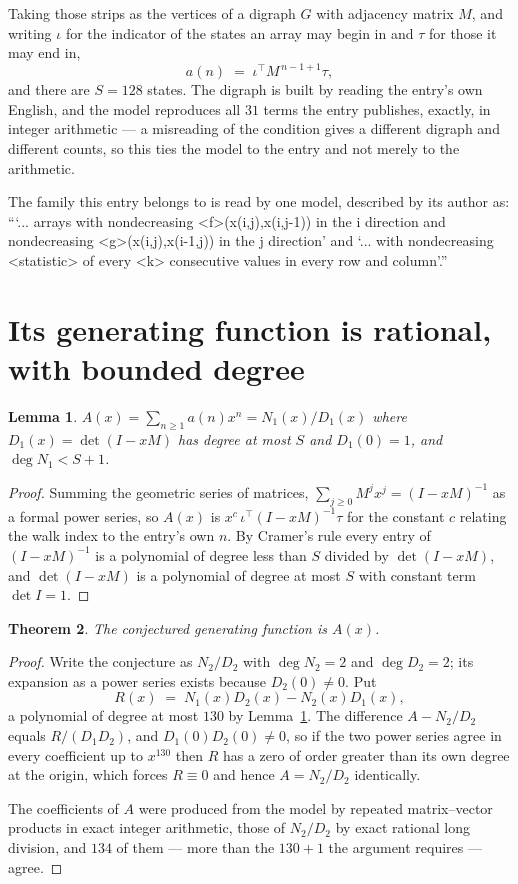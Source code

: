 \documentclass[11pt,a4paper]{article}
\theoremstyle{plain}
\newtheorem{theorem}{Theorem}
\newtheorem{lemma}[theorem]{Lemma}
\theoremstyle{definition}
\begin{document}
Taking those strips as the vertices of a digraph $G$ with adjacency matrix $M$, and writing
$\iota$ for the indicator of the states an array may begin in and $\tau$ for those it may end
in,
\[
a(n)\;=\;\iota^{\!\top}M^{\,n-1+1}\tau ,
\]
and there are $S=128$ states. The digraph is built by reading the entry's own English, and the
model reproduces all $31$ terms the entry publishes, exactly, in integer arithmetic --- a
misreading of the condition gives a different digraph and different counts, so this ties the
model to the entry and not merely to the arithmetic.

The family this entry belongs to is read by one model, described by its author as: ```... arrays with nondecreasing <f>(x(i,j),x(i,j-1)) in the i direction and nondecreasing <g>(x(i,j),x(i-1,j)) in the j direction' and `... with nondecreasing <statistic> of every <k> consecutive values in every row and column'.''


\section{Its generating function is rational, with bounded degree}

\begin{lemma}\label{lem:rat}
$A(x)=\sum_{n\ge1}a(n)x^n=N_1(x)/D_1(x)$ where $D_1(x)=\det(I-xM)$ has degree at most
$S$ and $D_1(0)=1$, and $\deg N_1<S+1$.
\end{lemma}

\begin{proof}
Summing the geometric series of matrices, $\sum_{j\ge0}M^jx^j=(I-xM)^{-1}$ as a formal
power series, so $A(x)$ is $x^{c}\,\iota^{\!\top}(I-xM)^{-1}\tau$ for the constant $c$
relating the walk index to the entry's own $n$. By Cramer's rule every entry of
$(I-xM)^{-1}$ is a polynomial of degree less than $S$ divided by $\det(I-xM)$, and
$\det(I-xM)$ is a polynomial of degree at most $S$ with constant term $\det I=1$.
\end{proof}

\begin{theorem}
The conjectured generating function is $A(x)$.
\end{theorem}

\begin{proof}
Write the conjecture as $N_2/D_2$ with $\deg N_2=2$ and $\deg D_2=2$; its expansion as a
power series exists because $D_2(0)\neq0$. Put
\[
R(x)\;=\;N_1(x)D_2(x)-N_2(x)D_1(x),
\]
a polynomial of degree at most $130$ by Lemma~\ref{lem:rat}. The difference
$A-N_2/D_2$ equals $R/(D_1D_2)$, and $D_1(0)D_2(0)\neq0$, so if the two power series agree in
every coefficient up to $x^{130}$ then $R$ has a zero of order greater than its own
degree at the origin, which forces $R\equiv0$ and hence $A=N_2/D_2$ identically.

The coefficients of $A$ were produced from the model by repeated matrix--vector products in
exact integer arithmetic, those of $N_2/D_2$ by exact rational long division, and $134$
of them --- more than the $130+1$ the argument requires --- agree.
\end{proof}
\end{document}
